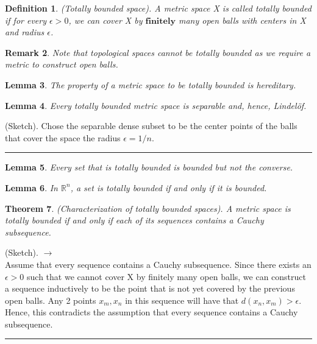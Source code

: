 \documentclass[twoside]{article}
\newcounter{lecnum}
\newtheorem{theorem}{Theorem}[lecnum]
\newtheorem{lemma}[theorem]{Lemma}
\newtheorem{definition}[theorem]{Definition}
\newtheorem{remark}[theorem]{Remark}
\newenvironment{proof}{{\bf Proof:}}{\hfill\rule{2mm}{2mm}}
\begin{document}
\begin{definition}(Totally bounded space). A metric space X is called totally bounded if for every $\epsilon > 0$, we can cover X by $\textbf{finitely}$ many open balls with centers in X and radius $\epsilon$.
\end{definition}


\begin{remark}Note that topological spaces cannot be totally bounded as we require a metric to construct open balls.
\end{remark}

\begin{lemma} The property of a metric space to be totally bounded is hereditary.
\end{lemma}

\begin{lemma}Every totally bounded metric space is separable and, hence, Lindelöf.
\end{lemma}
\begin{proof}(Sketch). Chose the separable dense subset to be the center points of the balls that cover the space the radius $\epsilon = 1/n$.
\end{proof}

\begin{lemma}Every set that is totally bounded is bounded but not the converse.
\end{lemma}

\begin{lemma}In $\mathbb{R}^n$, a set is totally bounded if and only if it is bounded.
\end{lemma}

\begin{theorem}(Characterization of totally bounded spaces). A metric space is totally bounded if and only if each of its sequences contains a Cauchy subsequence.
\end{theorem}

\begin{proof}(Sketch). $\rightarrow$\\ Assume that every sequence contains a Cauchy subsequence. Since there exists an $\epsilon > 0$ such that we cannot cover X by finitely many open balls, we can construct a sequence inductively to be the point that is not yet covered by the previous open balls. Any 2 points $x_m, x_n$ in this sequence will have that $d(x_n, x_m) > \epsilon$. Hence, this contradicts the assumption that every sequence contains a Cauchy subsequence.
\end{proof}
\end{document}
